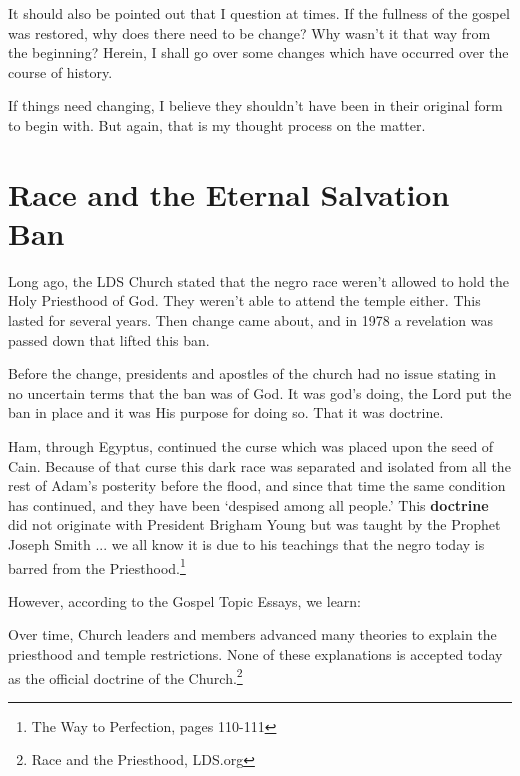 \documentclass{article}
\begin{document}
It should also be pointed out that I question at times. If the fullness of the 
gospel was restored, why does there need to be change? Why wasn't it that way 
from the beginning? Herein, I shall go over some changes which have occurred
over the course of history.

If things need changing, I believe they shouldn't have been in their original
form to begin with. But again, that is my thought process on the matter.

\newpage

\section{Race and the Eternal Salvation Ban}

Long ago, the LDS Church stated that the negro race weren't allowed to hold the 
Holy Priesthood of God. They weren't able to attend the temple either. This 
lasted for several years. Then change came about, and in 1978 a revelation was 
passed down that lifted this ban.

Before the change, presidents and apostles of the church had no issue stating in 
no uncertain terms that the ban was of God. It was god's doing, the Lord put the 
ban in place and it was His purpose for doing so. That it was doctrine.

\begin{displayquote}
Ham, through Egyptus, continued the curse which was placed upon the seed of 
Cain. Because of that curse this dark race was separated and isolated from all 
the rest of Adam's posterity before the flood, and since that time the same 
condition has continued, and they have been `despised among all people.' 
This \textbf{doctrine} did not originate with President Brigham Young but was 
taught by the Prophet Joseph Smith ... we all know it is due to his teachings 
that the negro today is barred from the 
Priesthood.\footnote{The Way to Perfection, pages 110-111}
\end{displayquote}

However, according to the Gospel Topic Essays, we learn:

\begin{displayquote}
Over time, Church leaders and members advanced many theories to explain the 
priesthood and temple restrictions. None of these explanations is accepted 
today as the official doctrine of the 
Church.\footnote{Race and the Priesthood, LDS.org}
\end{displayquote}
\end{document}
